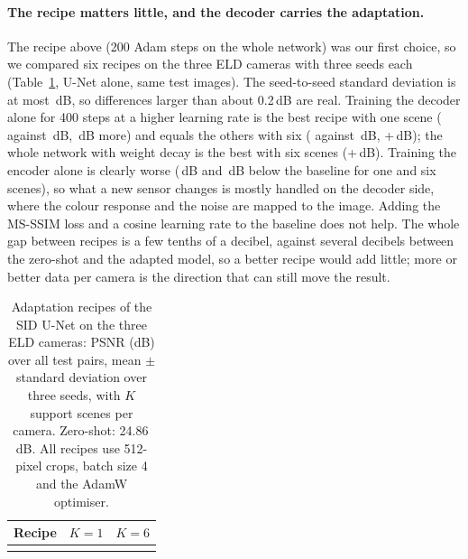 \paragraph{The recipe matters little, and the decoder carries the adaptation.} The recipe above (200 Adam steps on the whole network) was our first choice, so we compared six recipes on the three ELD cameras with three seeds each (Table~\ref{tab:recipes}, U-Net alone, same test images). The seed-to-seed standard deviation is at most \RGSDMAX\,dB, so differences larger than about 0.2\,dB are real. Training the decoder alone for 400 steps at a higher learning rate is the best recipe with one scene (\RGDECONE{} against \RGBASEONE\,dB, \RGDECGAINONE\,dB more) and equals the others with six (\RGDECSIX{} against \RGBASESIX\,dB, +\RGDECGAINSIX\,dB); the whole network with weight decay is the best with six scenes (+\RGWDGAINSIX\,dB). Training the encoder alone is clearly worse (\RGENCDROPONE\,dB and \RGENCDROPSIX\,dB below the baseline for one and six scenes), so what a new sensor changes is mostly handled on the decoder side, where the colour response and the noise are mapped to the image. Adding the MS-SSIM loss and a cosine learning rate to the baseline does not help. The whole gap between recipes is a few tenths of a decibel, against several decibels between the zero-shot and the adapted model, so a better recipe would add little; more or better data per camera is the direction that can still move the result.

\begin{table}[t]
\centering
\caption{Adaptation recipes of the SID U-Net on the three ELD cameras: PSNR (dB) over all test pairs, mean $\pm$ standard deviation over three seeds, with $K$ support scenes per camera. Zero-shot: 24.86\,dB. All recipes use 512-pixel crops, batch size 4 and the AdamW optimiser.}
\label{tab:recipes}
\small
\begin{tabular}{@{}lcc@{}}
\toprule
Recipe & $K=1$ & $K=6$ \\
\midrule
\\
\bottomrule
\end{tabular}
\end{table}

